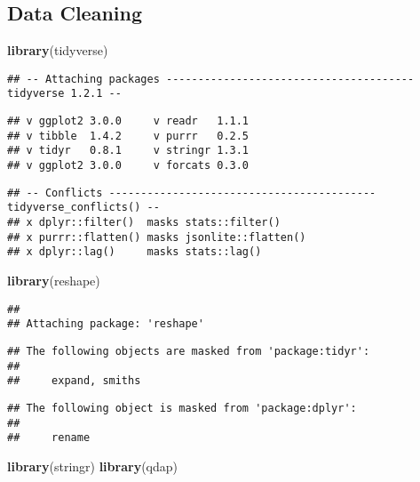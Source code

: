 \documentclass[]{article}
\newenvironment{Shaded}{\begin{snugshade}}{\end{snugshade}}
\newcommand{\KeywordTok}[1]{\textcolor[rgb]{0.13,0.29,0.53}{\textbf{#1}}}
\newcommand{\NormalTok}[1]{#1}
\begin{document}
\subsection{Data Cleaning}\label{data-cleaning}

\begin{Shaded}
\begin{Highlighting}[]
\KeywordTok{library}\NormalTok{(tidyverse)}
\end{Highlighting}
\end{Shaded}

\begin{verbatim}
## -- Attaching packages --------------------------------------- tidyverse 1.2.1 --
\end{verbatim}

\begin{verbatim}
## v ggplot2 3.0.0     v readr   1.1.1
## v tibble  1.4.2     v purrr   0.2.5
## v tidyr   0.8.1     v stringr 1.3.1
## v ggplot2 3.0.0     v forcats 0.3.0
\end{verbatim}

\begin{verbatim}
## -- Conflicts ------------------------------------------ tidyverse_conflicts() --
## x dplyr::filter()  masks stats::filter()
## x purrr::flatten() masks jsonlite::flatten()
## x dplyr::lag()     masks stats::lag()
\end{verbatim}

\begin{Shaded}
\begin{Highlighting}[]
\KeywordTok{library}\NormalTok{(reshape)}
\end{Highlighting}
\end{Shaded}

\begin{verbatim}
## 
## Attaching package: 'reshape'
\end{verbatim}

\begin{verbatim}
## The following objects are masked from 'package:tidyr':
## 
##     expand, smiths
\end{verbatim}

\begin{verbatim}
## The following object is masked from 'package:dplyr':
## 
##     rename
\end{verbatim}

\begin{Shaded}
\begin{Highlighting}[]
\KeywordTok{library}\NormalTok{(stringr)}
\KeywordTok{library}\NormalTok{(qdap)}
\end{Highlighting}
\end{Shaded}
\end{document}
